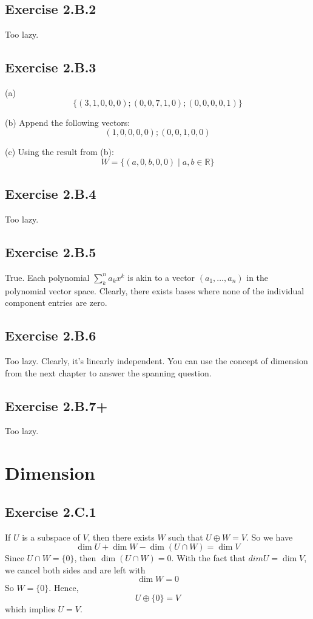 \documentclass{book}
\begin{document}
\subsection*{Exercise 2.B.2}
Too lazy.

\subsection*{Exercise 2.B.3}
(a)
$$\{ (3, 1, 0, 0, 0); (0, 0, 7, 1, 0); (0, 0, 0, 0, 1) \}$$

\noindent
(b)
Append the following vectors:
$$(1, 0, 0, 0, 0); (0, 0, 1, 0, 0)$$

\noindent
(c) Using the result from (b):
$$W = \{ (a, 0, b, 0, 0) \mid a, b \in \mathbb{R} \}$$

\subsection*{Exercise 2.B.4}
Too lazy.

\subsection*{Exercise 2.B.5}
True. Each polynomial $\sum_k^n a_k x^k$ is akin to a vector $(a_1, \ldots, a_n)$ in the polynomial vector space. Clearly, there exists bases where none of the individual component entries are zero.

\subsection*{Exercise 2.B.6}
Too lazy. Clearly, it's linearly independent. You can use the concept of dimension from the next chapter to answer the spanning question.

\subsection*{Exercise 2.B.7+}
Too lazy.

\section{Dimension}

\subsection*{Exercise 2.C.1}
If $U$ is a subspace of $V$, then there exists $W$ such that $U \oplus W = V$. So we have
$$\dim U + \dim W - \dim (U \cap W) = \dim V$$
Since $U \cap W = \{ 0 \}$, then $\dim (U \cap W) = 0$. With the fact that $dim U = \dim V$, we cancel both sides and are left with
$$\dim W = 0$$
So $W = \{ 0 \}$. Hence,
$$U \oplus \{ 0 \} = V$$
which implies $U = V$.
\end{document}
